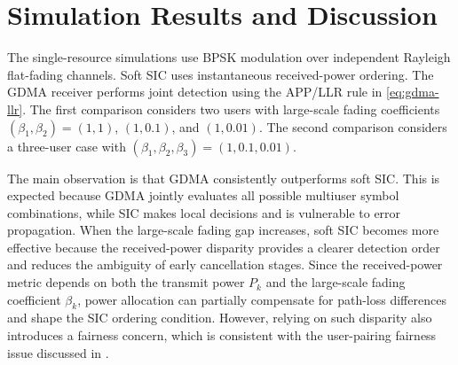 
\section{Simulation Results and Discussion}

The single-resource simulations use BPSK modulation over independent Rayleigh flat-fading channels. Soft SIC uses instantaneous received-power ordering. The GDMA receiver performs joint detection using the APP/LLR rule in \eqref{eq:gdma-llr}. The first comparison considers two users with large-scale fading coefficients $(\beta_1,\beta_2)=(1,1)$, $(1,0.1)$, and $(1,0.01)$. The second comparison considers a three-user case with $(\beta_1,\beta_2,\beta_3)=(1,0.1,0.01)$.





The main observation is that GDMA consistently outperforms soft SIC. This is expected because GDMA jointly evaluates all possible multiuser symbol combinations, while SIC makes local decisions and is vulnerable to error propagation. When the large-scale fading gap increases, soft SIC becomes more effective because the received-power disparity provides a clearer detection order and reduces the ambiguity of early cancellation stages. Since the received-power metric depends on both the transmit power $P_k$ and the large-scale fading coefficient $\beta_k$, power allocation can partially compensate for path-loss differences and shape the SIC ordering condition. However, relying on such disparity also introduces a fairness concern, which is consistent with the user-pairing fairness issue discussed in \cite{ding2015pairing}.

